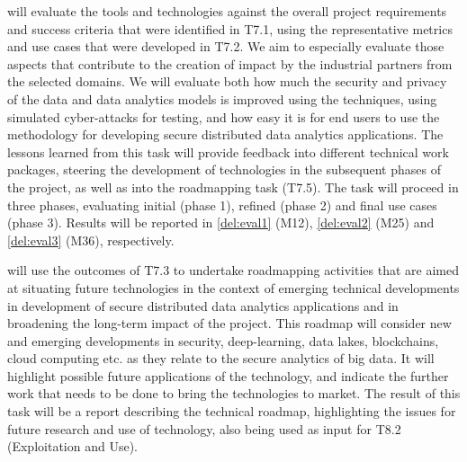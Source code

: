 \begin{Workpackage}{\thewpno}
\begin{Task}
\end{Task}

\begin{Task}
\TaskResults{%
}
\TaskHeader{}
\theTask{} will evaluate the \TheProject{} tools and technologies against the overall project requirements and success criteria that were identified in T7.1, using the representative metrics and use cases that were developed in T7.2. We aim to especially evaluate those aspects that contribute to the creation of impact by the industrial partners from the selected domains. We will evaluate both how much the security and privacy of the data and data analytics models is improved using the \TheProject{} techniques, using simulated cyber-attacks for testing, and how easy it is for end users to use the \TheProject{} methodology for developing secure distributed data analytics applications. The lessons learned from this task will provide feedback into different technical work packages, steering the development of \TheProject{} technologies in the subsequent phases of the project, as well as into the roadmapping task (T7.5). The task will proceed in three phases, evaluating initial (phase 1), refined (phase 2) and final use cases (phase 3). Results will be reported in \ref{del:eval1} (M12), \ref{del:eval2} (M25) and \ref{del:eval3} (M36), respectively. 
\end{Task}

\begin{Task}
  \TaskHeader{}
  \theTask{} will use the outcomes of T7.3 to undertake roadmapping activities that are aimed at situating future \TheProject{} technologies in the context of emerging technical developments in development of secure distributed data analytics applications and in broadening the long-term impact of the \TheProject{} project. This roadmap will consider new and emerging developments in security, deep-learning, data lakes, blockchains, cloud computing etc. as they relate to the secure analytics of big data. It will highlight possible future applications of the \TheProject{} technology, and indicate the further work that needs to be done to bring the \TheProject{} technologies to market. The result of this task will be a report describing the technical roadmap, highlighting the issues for future research and use of \TheProject{} technology, also being used as input for T8.2 (Exploitation and Use). 
  \end{Task}
  


\end{Workpackage}
